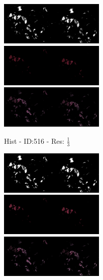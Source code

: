 \documentclass[letterpaper,10pt,oneside]{article}
\begin{document}
\begin{figure}[hbtp]
  \centering
  \begin{subfigure}[b]{5cm}
    \includegraphics[width=5cm]{visualization/results/histogramSeg/res_reduce_3/Region_0_PO13-00516A1_1_7_201305171148.png}
    \includegraphics[width=5cm]{visualization/results/histogramSeg/res_reduce_3/Region_1_PO13-00516A1_1_7_201305171148.png}
    \includegraphics[width=5cm]{visualization/results/histogramSeg/res_reduce_3/Region_2_PO13-00516A1_1_7_201305171148.png}
    \caption{Hist - ID:516 - Res: $\frac{1}{3}$}
  \end{subfigure}
  \begin{subfigure}[b]{5cm}
    \includegraphics[width=5cm]{visualization/results/histogramSeg/res_reduce_4/Region_0_PO13-00516A1_1_7_201305171148.png}
    \includegraphics[width=5cm]{visualization/results/histogramSeg/res_reduce_4/Region_1_PO13-00516A1_1_7_201305171148.png}
    \includegraphics[width=5cm]{visualization/results/histogramSeg/res_reduce_4/Region_2_PO13-00516A1_1_7_201305171148.png}

\end{subfigure}
\end{figure}
\end{document}
